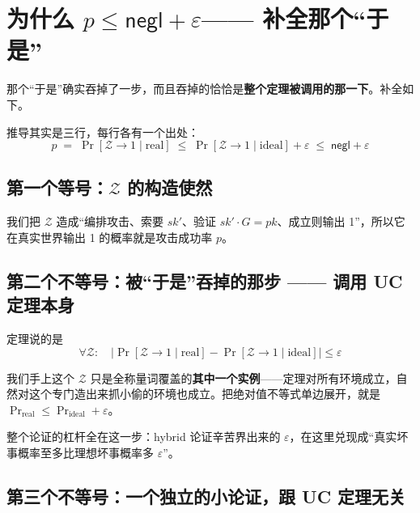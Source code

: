 

\section{\texorpdfstring{为什么 $p \le \mathsf{negl} + \varepsilon$------ 补全那个“于是”}{为什么p \textbackslash le \textbackslash mathsf\{negl\} + \textbackslash varepsilon------ 补全那个“于是”}}

那个“于是”确实吞掉了一步，而且吞掉的恰恰是\textbf{整个定理被调用的那一下}。补全如下。

推导其实是三行，每行各有一个出处：
\begin{equation}\label{eq:temp:1}
p \;=\; \Pr[\mathcal{Z}\to 1 \mid \text{real}]
\;\le\; \Pr[\mathcal{Z}\to 1 \mid \text{ideal}] + \varepsilon
\;\le\; \mathsf{negl} + \varepsilon
\end{equation}

\subsection{\texorpdfstring{第一个等号：$\mathcal{Z}$ 的构造使然}{第一个等号：\textbackslash mathcal\{Z\}的构造使然}}

我们把 $\mathcal{Z}$ 造成“编排攻击、索要 $sk'$、验证 $sk' \cdot G = pk$、成立则输出
1”，所以它在真实世界输出 1 的概率就是攻击成功率 $p$。

\subsection{第二个不等号：被“于是”吞掉的那步 ------ 调用 UC 定理本身}

定理说的是
\begin{equation}\label{eq:temp:2}
\forall \mathcal{Z}:\quad
\left| \Pr[\mathcal{Z}\to 1 \mid \text{real}] - \Pr[\mathcal{Z}\to 1 \mid \text{ideal}] \right| \le \varepsilon
\end{equation}

我们手上这个 $\mathcal{Z}$ 只是全称量词覆盖的\textbf{其中一个实例}------定理对所有环境成立，自然对这个专门造出来抓小偷的环境也成立。把绝对值不等式单边展开，就是 $\Pr_{\text{real}} \le \Pr_{\text{ideal}} + \varepsilon$。

整个论证的杠杆全在这一步：hybrid
论证辛苦界出来的 $\varepsilon$，在这里兑现成“真实坏事概率至多比理想坏事概率多 $\varepsilon$”。

\subsection{第三个不等号：一个独立的小论证，跟 UC 定理无关}

